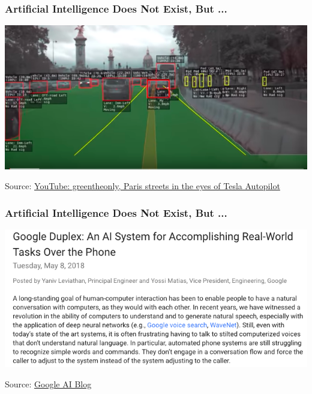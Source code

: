 \begin{frame}
\begin{tikzpicture}
\end{tikzpicture}

\end{frame}

\begin{frame}
\frametitle{Artificial Intelligence Does Not Exist, But ...}
\includegraphics[width=\textwidth]{figures/tesla_paris}

Source: \href{https://www.youtube.com/watch?v=_1MHGUC_BzQs}{YouTube: greentheonly, Paris streets in the eyes of Tesla Autopilot}
\end{frame}

\begin{frame}
\frametitle{Artificial Intelligence Does Not Exist, But ...}
\includegraphics[width=\textwidth]{figures/google_duplex}

Source: \href{https://ai.googleblog.com/2018/05/duplex-ai-system-for-natural-conversation.html}{Google AI Blog}
\end{frame}

